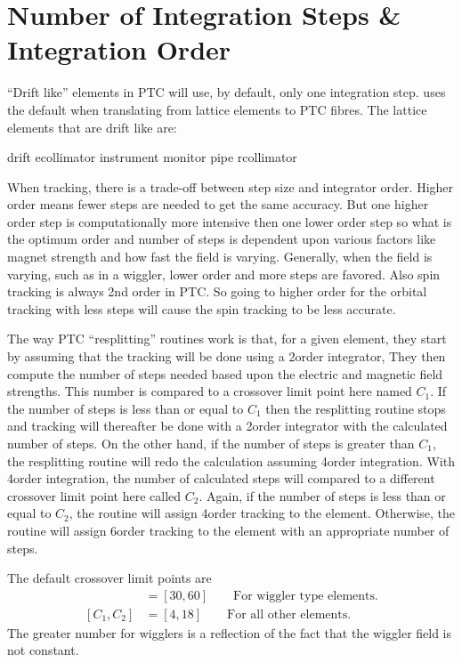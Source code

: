 {{{{{{%
\section{Number of Integration Steps \& Integration Order}
\label{s:ptc.step}

``Drift like'' elements in PTC will use, by default, only one
integration step. \bmad uses the default when translating from \bmad
lattice elements to PTC fibres. The \bmad lattice elements that are
drift like are:
\begin{example}
  drift
  ecollimator 
  instrument 
  monitor 
  pipe
  rcollimator 
\end{example}

When tracking, there is a trade-off between step size and integrator order. Higher order
means fewer steps are needed to get the same accuracy. But one higher order step is
computationally more intensive then one lower order step so what is the optimum order and
number of steps is dependent upon various factors like magnet strength and how fast the
field is varying. Generally, when the field is varying, such as in a wiggler, lower order
and more steps are favored. Also spin tracking is always 2nd order in PTC. So going to higher
order for the orbital tracking with less steps will cause the spin tracking to be less
accurate.

The way PTC ``resplitting'' routines work is that, for a given element, they start by
assuming that the tracking will be done using a 2\Nd order integrator, They then compute
the number of steps needed based upon the electric and magnetic field strengths. This
number is compared to a crossover limit point here named $C_1$. If the number of steps is
less than or equal to $C_1$ then the resplitting routine stops and tracking will
thereafter be done with a 2\Nd order integrator with the calculated number of steps. On
the other hand, if the number of steps is greater than $C_1$, the resplitting routine will
redo the calculation assuming 4\Th order integration. With 4\Th order integration, the
number of calculated steps will compared to a different crossover limit point here called
$C_2$. Again, if the number of steps is less than or equal to $C_2$, the routine will
assign 4\Th order tracking to the element. Otherwise, the routine will assign 6\Th order
tracking to the element with an appropriate number of steps.

The default crossover limit points are
\begin{align}
  [C_1, C_2] & = [30, 60] \qquad \text{For wiggler type elements.} \nonumber \\
  [C_1, C_2] & = [4, 18]  \qquad \text{For all other elements.} \nonumber 
\end{align}
The greater number for wigglers is a reflection of the fact that the wiggler field
is not constant.

}}}}}}
